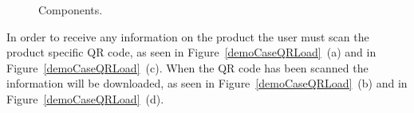 	\begin{figure}[H]%
		\centering
		\qquad
		\qquad
		\qquad
		\qquad
		\caption{Components.}
		\label{demoCaseRaw}
	\end{figure}

In order to receive any information on the product the user must scan the product specific QR code, as seen in Figure~\ref{demoCaseQRLoad}~(a) and in Figure~\ref{demoCaseQRLoad}~(c). When the QR code has been scanned the information will be downloaded, as seen in Figure~\ref{demoCaseQRLoad}~(b) and in Figure~\ref{demoCaseQRLoad}~(d).

